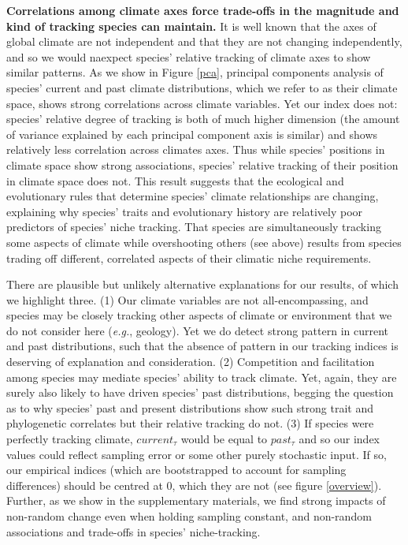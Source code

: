 \documentclass[12pt]{report}
\newcommand{\eg}{\emph{e.g.}\xspace}
\begin{document}
\textbf{Correlations among climate axes force trade-offs in the
  magnitude and kind of tracking species can maintain.} It is well
known that the axes of global climate are not independent and that
they are not changing independently\supercite{Harris2014,IPCC2014},
and so we would na\ively expect species' relative tracking of climate
axes to show similar patterns. As we show in Figure \ref{pca},
principal components analysis of species' current and past climate
distributions, which we refer to as their climate space, shows strong
correlations across climate variables. Yet our index does not:
species' relative degree of tracking is both of much higher dimension
(the amount of variance explained by each principal component axis is
similar) and shows relatively less correlation across climates
axes. Thus while species' positions in climate space show strong
associations, species' relative tracking of their position in climate
space does not. This result suggests that the ecological and
evolutionary rules that determine species' climate relationships are
changing, explaining why species' traits and evolutionary history are
relatively poor predictors of species' niche tracking. That species
are simultaneously tracking some aspects of climate while overshooting
others (see above) results from species trading off different,
correlated aspects of their climatic niche requirements. 

There are plausible but unlikely alternative explanations for our
results, of which we highlight three. (1) Our climate variables are
not all-encompassing, and species may be closely tracking other
aspects of climate or environment that we do not consider here (\eg,
geology). Yet we do detect strong pattern in current and past
distributions, such that the absence of pattern in our tracking
indices is deserving of explanation and consideration. (2) Competition
and facilitation among species may mediate species' ability to track
climate\supercite{Davis1999}. Yet, again, they are surely also likely
to have driven species' past distributions, begging the question as to
why species' past and present distributions show such strong trait and
phylogenetic correlates but their relative tracking do not. (3) If
species were perfectly tracking climate, $current_\tau$ would be equal
to $past_\tau$ and so our index values could reflect sampling error or
some other purely stochastic input. If so, our empirical indices
(which are bootstrapped to account for sampling differences) should be
centred at 0, which they are not (see figure \ref{overview}). Further,
as we show in the supplementary materials, we find strong impacts of
non-random change even when holding sampling constant, and non-random
associations and trade-offs in species' niche-tracking.
\end{document}
